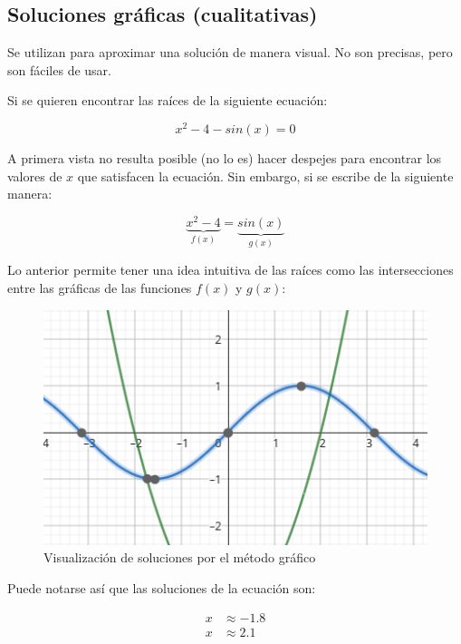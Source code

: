 \subsection{Soluciones gráficas (cualitativas)}

Se utilizan para aproximar una solución de manera visual. No son precisas, pero
son fáciles de usar.

\begin{eg}
    Si se quieren encontrar las raíces de la siguiente
    ecuación:

    \begin{equation}\label{primer-problema}
        x^2 - 4 - sin(x) = 0
    \end{equation}

    A primera vista no resulta posible (no lo es) hacer despejes para
    encontrar los valores de \(x\) que satisfacen la ecuación. Sin embargo,
    si se escribe de la siguiente manera:

    \[
        \underbrace{x^2 - 4}_{f(x)} = \underbrace{sin(x)}_{g(x)}
    \]

    Lo anterior permite tener una idea intuitiva de las raíces como las
    intersecciones entre las gráficas de las funciones \(f(x)\) y \(g(x)\):

    \begin{figure}[H]
        \centering
        \includegraphics[width=1.0\textwidth]{img/papu.png}
        \caption{Visualización de soluciones por el método gráfico}
    \end{figure}

    Puede notarse así que las soluciones de la ecuación son:

    \begin{align*}
        x & \approx -1.8 \\
        x & \approx 2.1
    \end{align*}

\end{eg}

